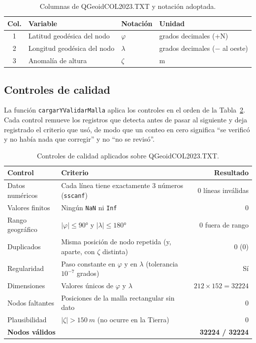 \documentclass[11pt,letterpaper]{article}
\begin{document}
\begin{table}[H]
\centering
\caption{Columnas de QGeoidCOL2023.TXT y notación adoptada.}
\label{tab:notacion}
\begin{tabular}{@{}clll@{}}
\toprule
Col. & Variable & Notación & Unidad \\
\midrule
1 & Latitud geodésica del nodo & $\varphi$ & grados decimales (+N) \\
2 & Longitud geodésica del nodo & $\lambda$ & grados decimales ($-$ al oeste) \\
3 & Anomalía de altura & $\zeta$ & m \\
\bottomrule
\end{tabular}
\end{table}

\subsection{Controles de calidad}
La función \texttt{cargarYValidarMalla} aplica los controles en el orden de la
Tabla~\ref{tab:qc}. Cada control remueve los registros que detecta antes de pasar al
siguiente y deja registrado el criterio que usó, de modo que un conteo en cero significa
``se verificó y no había nada que corregir'' y no ``no se revisó''.

\begin{table}[H]
\centering
\caption{Controles de calidad aplicados sobre QGeoidCOL2023.TXT.}
\label{tab:qc}
\renewcommand{\arraystretch}{1.25}
\begin{tabular}{@{}p{3.4cm}p{7.6cm}r@{}}
\toprule
Control & Criterio & Resultado \\
\midrule
Datos numéricos & Cada línea tiene exactamente 3 números (\texttt{sscanf}) & 0 líneas inválidas \\
Valores finitos & Ningún \texttt{NaN} ni \texttt{Inf} & 0 \\
Rango geográfico & $|\varphi|\le\ang{90}$ y $|\lambda|\le\ang{180}$ & 0 fuera de rango \\
Duplicados & Misma posición de nodo repetida (y, aparte, con $\zeta$ distinta) & 0 (0) \\
Regularidad & Paso constante en $\varphi$ y en $\lambda$ (tolerancia $10^{-7}$ grados) & Sí \\
Dimensiones & Valores únicos de $\varphi$ y $\lambda$ & $212\times152=\num{32224}$ \\
Nodos faltantes & Posiciones de la malla rectangular sin dato & 0 \\
Plausibilidad & $|\zeta|>\SI{150}{m}$ (no ocurre en la Tierra) & 0 \\
\midrule
\multicolumn{2}{l}{\textbf{Nodos válidos}} & \textbf{\num{32224} / \num{32224}} \\
\bottomrule
\end{tabular}
\end{table}
\end{document}
